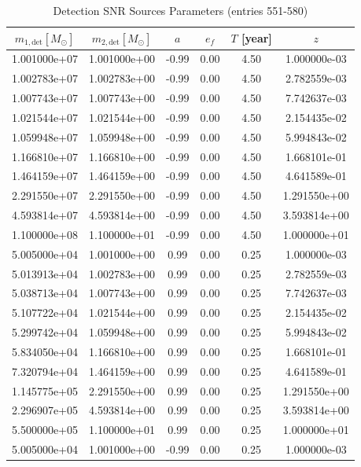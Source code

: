 \documentclass{article}
\begin{document}
\clearpage

\begin{table}[htbp]
\centering
\caption{Detection SNR Sources Parameters (entries 551-580)}
\label{tab:snr_sources_12}
\begin{tabular}{cccccc}
\hline
$m_{1,\mathrm{det}} [M_\odot]$ & $m_{2,\mathrm{det}} [M_\odot]$ & $a$ & $e_f$ & $T$ [year] & $z$ \\
\hline
1.001000e+07 & 1.001000e+00 & -0.99 & 0.00 & 4.50 & 1.000000e-03 \\
1.002783e+07 & 1.002783e+00 & -0.99 & 0.00 & 4.50 & 2.782559e-03 \\
1.007743e+07 & 1.007743e+00 & -0.99 & 0.00 & 4.50 & 7.742637e-03 \\
1.021544e+07 & 1.021544e+00 & -0.99 & 0.00 & 4.50 & 2.154435e-02 \\
1.059948e+07 & 1.059948e+00 & -0.99 & 0.00 & 4.50 & 5.994843e-02 \\
1.166810e+07 & 1.166810e+00 & -0.99 & 0.00 & 4.50 & 1.668101e-01 \\
1.464159e+07 & 1.464159e+00 & -0.99 & 0.00 & 4.50 & 4.641589e-01 \\
2.291550e+07 & 2.291550e+00 & -0.99 & 0.00 & 4.50 & 1.291550e+00 \\
4.593814e+07 & 4.593814e+00 & -0.99 & 0.00 & 4.50 & 3.593814e+00 \\
1.100000e+08 & 1.100000e+01 & -0.99 & 0.00 & 4.50 & 1.000000e+01 \\
5.005000e+04 & 1.001000e+00 & 0.99 & 0.00 & 0.25 & 1.000000e-03 \\
5.013913e+04 & 1.002783e+00 & 0.99 & 0.00 & 0.25 & 2.782559e-03 \\
5.038713e+04 & 1.007743e+00 & 0.99 & 0.00 & 0.25 & 7.742637e-03 \\
5.107722e+04 & 1.021544e+00 & 0.99 & 0.00 & 0.25 & 2.154435e-02 \\
5.299742e+04 & 1.059948e+00 & 0.99 & 0.00 & 0.25 & 5.994843e-02 \\
5.834050e+04 & 1.166810e+00 & 0.99 & 0.00 & 0.25 & 1.668101e-01 \\
7.320794e+04 & 1.464159e+00 & 0.99 & 0.00 & 0.25 & 4.641589e-01 \\
1.145775e+05 & 2.291550e+00 & 0.99 & 0.00 & 0.25 & 1.291550e+00 \\
2.296907e+05 & 4.593814e+00 & 0.99 & 0.00 & 0.25 & 3.593814e+00 \\
5.500000e+05 & 1.100000e+01 & 0.99 & 0.00 & 0.25 & 1.000000e+01 \\
5.005000e+04 & 1.001000e+00 & -0.99 & 0.00 & 0.25 & 1.000000e-03 \\

\end{tabular}
\end{table}
\end{document}
